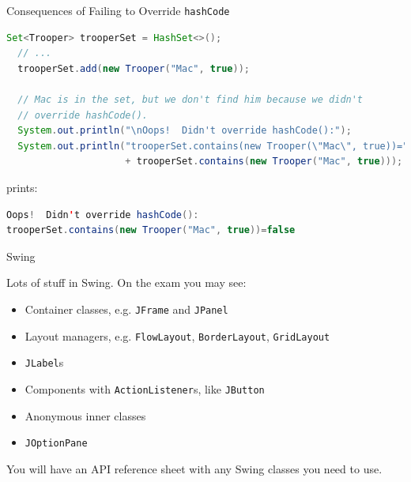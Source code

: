 \documentclass{beamer}
\begin{document}
\begin{frame}[fragile]{Consequences of Failing to Override {\tt hashCode}}

\begin{lstlisting}[language=Java]
  Set<Trooper> trooperSet = HashSet<>();
  // ...
  trooperSet.add(new Trooper("Mac", true));

  // Mac is in the set, but we don't find him because we didn't
  // override hashCode().
  System.out.println("\nOops!  Didn't override hashCode():");
  System.out.println("trooperSet.contains(new Trooper(\"Mac\", true))="
                     + trooperSet.contains(new Trooper("Mac", true)));

\end{lstlisting}
prints:
\begin{lstlisting}[language=Java]
Oops!  Didn't override hashCode():
trooperSet.contains(new Trooper("Mac", true))=false
\end{lstlisting}

\end{frame}


\begin{frame}[fragile]{Swing}


Lots of stuff in Swing.  On the exam you may see:
\begin{itemize}
\item Container classes, e.g. {\tt JFrame} and {\tt JPanel}
\item Layout managers, e.g. {\tt FlowLayout}, {\tt BorderLayout}, {\tt GridLayout}
\item {\tt JLabel}s
\item Components with {\tt ActionListener}s, like {\tt JButton}
\item Anonymous inner classes
\item {\tt JOptionPane}
\end{itemize}
You will have an API reference sheet with any Swing classes you need to use.

\end{frame}







\end{document}
